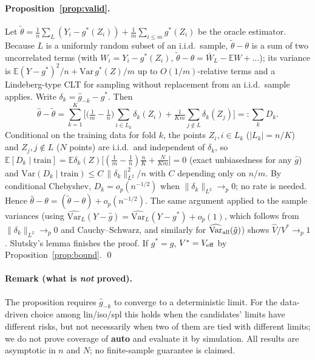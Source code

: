 \paragraph{Proposition~\ref{prop:valid}.} Let $\tilde\theta=\frac1n\sum_L(Y_i-g^*(Z_i))+\frac1m\sum_{i\le m}g^*(Z_i)$ be the oracle estimator. Because $L$ is a uniformly random subset of an i.i.d.\ sample, $\tilde\theta-\theta$ is a sum of two uncorrelated terms (with $W_i=Y_i-g^*(Z_i)$, $\tilde\theta-\theta=\bar W_L-\mathbb EW+\ldots$); its variance is $\mathbb E(Y-g^*)^2/n+\mathrm{Var}\,g^*(Z)/m$ up to $O(1/m)$-relative terms and a Lindeberg-type CLT for sampling without replacement from an i.i.d.\ sample applies. Write $\delta_k=\hat g_{-k}-g^*$. Then
\[
\hat\theta-\tilde\theta=\sum_{k=1}^K\Big[\Big(\tfrac1m-\tfrac1n\Big)\sum_{i\in L_k}\delta_k(Z_i)+\tfrac1{Km}\sum_{j\notin L}\delta_k(Z_j)\Big]=:\sum_k D_k .
\]
Conditional on the training data for fold $k$, the points $Z_i,i\in L_k$ ($|L_k|=n/K$) and $Z_j,j\notin L$ ($N$ points) are i.i.d.\ and independent of $\delta_k$, so $\mathbb E[D_k\mid\text{train}]=\mathbb E\delta_k(Z)\big[(\tfrac1m-\tfrac1n)\tfrac nK+\tfrac N{Km}\big]=0$ (exact unbiasedness for any $\hat g$) and $\mathrm{Var}(D_k\mid\text{train})\le C\,\|\delta_k\|_{L^2}^2/n$ with $C$ depending only on $n/m$. By conditional Chebyshev, $D_k=o_p(n^{-1/2})$ when $\|\delta_k\|_{L^2}\to_p0$; no rate is needed. Hence $\hat\theta-\theta=(\tilde\theta-\theta)+o_p(n^{-1/2})$. The same argument applied to the sample variances (using $\widehat{\mathrm{Var}}_L(Y-\hat g)=\widehat{\mathrm{Var}}_L(Y-g^*)+o_p(1)$, which follows from $\|\delta_k\|_{L^2}\to_p 0$ and Cauchy--Schwarz, and similarly for $\widehat{\mathrm{Var}}_{\rm all}(\hat g)$) shows $\hat V/V^*\to_p1$. Slutsky's lemma finishes the proof. If $g^*=g$, $V^*=V_{\rm eff}$ by Proposition~\ref{prop:bound}. \qed

\paragraph{Remark (what is \emph{not} proved).} The proposition requires $\hat g_{-k}$ to converge to a deterministic limit. For the data-driven choice among lin/iso/spl this holds when the candidates' limits have different risks, but not necessarily when two of them are tied with different limits; we do not prove coverage of \textbf{auto} and evaluate it by simulation. All results are asymptotic in $n$ and $N$; no finite-sample guarantee is claimed.
